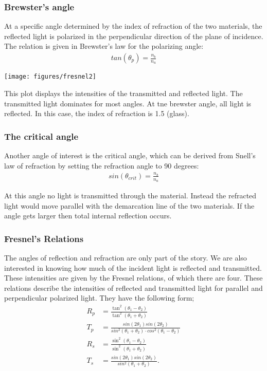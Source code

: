 \documentclass[working]{inputs/tuftebook}
\begin{document}
\subsubsection{Brewster's angle}
At a specific angle determined by the index of refraction of the two materials, the reflected light is polarized in the perpendicular direction of the plane of incidence. The relation is given in Brewster's law for the polarizing angle:
\begin{align*}
    tan(\theta_p) = \frac{n_b}{n_a}
\end{align*}
\begin{marginfigure}
	\texttt{[image: figures/fresnel2]}
	\caption{This plot displays the intensities of the transmitted and reflected light. The transmitted light dominates for most angles. At tne brewster angle, all light is reflected. In this case, the index of refraction is 1.5 (glass).}
\end{marginfigure}
\subsubsection{The critical angle}
Another angle of interest is the critical angle, which can be derived from Snell's law of refraction by setting the refraction angle to 90 degrees:
\begin{align*}
    sin(\theta_{crit})=\frac{n_b}{n_a}
\end{align*}

At this angle no light is transmitted through the material. Instead the refracted light would move parallel with the demarcation line of the two materials. If the angle gets larger then total internal reflection occurs.
\subsubsection{Fresnel's Relations}
The angles of reflection and refraction are only part of the story. We are also interested in knowing how much of the incident light is reflected and transmitted. These intensities are given by the Fresnel relations, of which there are four. These relations describe the intensities of reflected and transmitted light for parallel and perpendicular polarized light. They have the following form;
\begin{align*}
	R_p &= \frac{\tan^2 \left( \theta_1 - \theta_2  \right) }{\tan^2 \left( \theta_1 + \theta_2  \right) }\\
	T_p &= \frac{sin(2\theta_1) sin(2\theta_2)}{sin^2(\theta_1+\theta_2)\cdot cos^2(\theta_1-\theta_2)}\\
	R_s &= \frac{\sin^2\left( \theta_1 - \theta_2 \right) }{\sin^2\left( \theta_1 + \theta_2 \right) } \\
	T_s &= \frac{sin(2\theta_1)sin(2\theta_2)}{sin^2(\theta_1 + \theta_2)}
.\end{align*}
\end{document}
